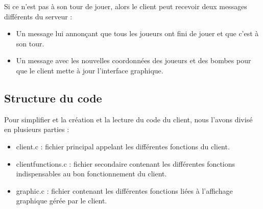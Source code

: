 Si ce n'est pas à son tour de jouer, alors le client peut recevoir deux messages différents du serveur :
\begin{itemize}
	\item Un message lui annonçant que tous les joueurs ont fini de jouer et que c'est à son tour.
	\item Un message avec les nouvelles coordonnées des joueurs et des bombes pour que le client mette à jour l'interface graphique.
\end{itemize}

\subsection*{Structure du code}

Pour simplifier et la création et la lecture du code du client, nous l'avons divisé en plusieurs parties :
\begin{itemize}
	\item client.c : fichier principal appelant les différentes fonctions du client.
	\item clientfunctions.c : fichier secondaire contenant les différentes fonctions indispensables au bon fonctionnement du client.
	\item graphic.c : fichier contenant les différentes fonctions liées à l'affichage graphique gérée par le client.
\end{itemize}
 

